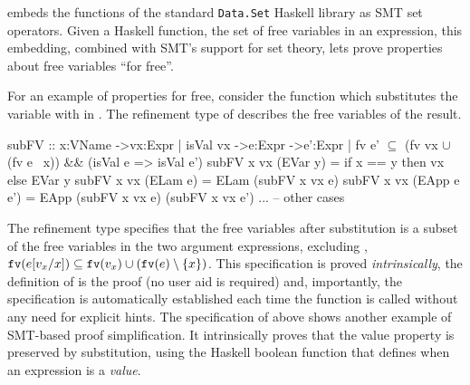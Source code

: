 %
\begin{conference}
  \lh embeds the functions of the standard
  \verb+Data.Set+ Haskell library as SMT
  set operators. Given a Haskell function,
  \eg the set of free variables in an expression,
  this embedding, combined with SMT's
  support for set theory, 
  lets \lh prove
  properties about  free variables
  ``for free''.
\end{conference}
%
For an example of properties for free, consider the function
 which substitutes
the variable  with
 in .
%
The refinement type of  
describes the free variables of the result.
%
\begin{mcode}
  subFV :: x:VName ->vx:{Expr | isVal vx } ->e:Expr
        ->{e':Expr | fv e' $\subseteq$ (fv vx $\cup$ (fv e \ x)) && (isVal e => isVal e')}
  subFV x vx (EVar y)    = if x == y then vx else EVar y
  subFV x vx (ELam   e)  = ELam (subFV x vx e)
  subFV x vx (EApp e e') = EApp (subFV x vx e) (subFV x vx e')
  ... -- other cases
\end{mcode}
%
The refinement type %
specifies
that the free variables after substitution is a subset
of the free variables in the two argument expressions,
excluding , \ie
$\mathtt{fv}(\subst{e}{x}{v_x}) \subseteq
\mathtt{fv}(v_x) \cup (\mathtt{fv}(e) \setminus \{x\})$.
This specification is proved \emph{intrinsically},
\ie the definition of  is the proof
(no user aid is required) and, importantly,
the specification is automatically established each time
the function  is called 
without any need for explicit hints.
%
The specification of  above shows another example
of SMT-based proof simplification. 
It intrinsically proves that the value property is preserved
by substitution, 
using 
the Haskell boolean
function  that defines
when an expression is a \emph{value}. 



